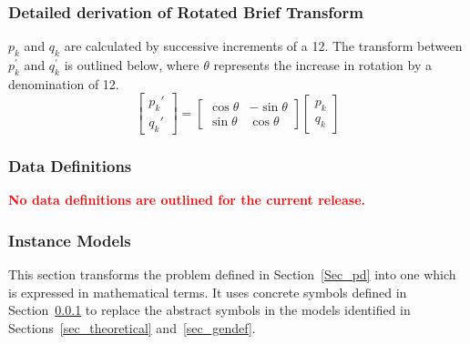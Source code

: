 \documentclass[12pt]{article}
\begin{document}
\subsubsection*{Detailed derivation of Rotated Brief Transform}
$\mathit{p_{k}}$ and $\mathit{q_{k}}$ are calculated by successive increments of a 12\textdegree. 
The transform between $\mathit{p_{k}^{'}}$ and $\mathit{q_{k}^{'}}$ is outlined below, where $\theta$ 
represents the increase in rotation by a denomination of 12\textdegree. \\

\[
\begin{bmatrix} p_k' \\ q_k' \end{bmatrix} =
\begin{bmatrix} \cos\theta & -\sin\theta \\ \sin\theta & \cos\theta \end{bmatrix}
\begin{bmatrix} p_k \\ q_k \end{bmatrix}
\]

\subsubsection{Data Definitions}\label{sec_datadef}
\textcolor{red}{\textbf{No data definitions are outlined for the current release.}}

\subsubsection{Instance Models} \label{sec_instance}    
This section transforms the problem defined in Section~\ref{Sec_pd} into 
one which is expressed in mathematical terms. It uses concrete symbols defined 
in Section~\ref{sec_datadef} to replace the abstract symbols in the models 
identified in Sections~\ref{sec_theoretical} and~\ref{sec_gendef}.

~\newline
\end{document}
